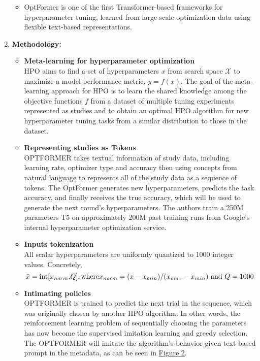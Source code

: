 \documentclass[11pt]{article}
\begin{document}
\begin{enumerate}
\begin{itemize}
            \item OptFormer is one of the first Transformer-based frameworks for hyperparameter tuning, learned from large-scale optimization data using flexible text-based representations.
    \end{itemize}
    \item
    \textbf{Methodology:}
    \begin{itemize}
        \item \textbf{Meta-learning for hyperparameter optimization}\\
        HPO aims to find a set of hyperparameters $x$ from search space $\mathcal{X}$ to maximize a model performance metric, $y = f(x)$. The goal of the meta-learning \cite{https://doi.org/10.48550/arxiv.2004.05439} approach for HPO is to learn the shared knowledge among the objective functions $f$ from a dataset of multiple tuning experiments represented as studies and to obtain an optimal HPO algorithm for new hyperparameter tuning tasks from a similar distribution to those in the dataset.\\
        \item \textbf{Representing studies as Tokens}\\
        OPTFORMER takes textual information of study data, including learning rate, optimizer type and accuracy then using concepts from natural language to represents all of the study data as a sequence of tokens. The OptFormer generates new hyperparameters, predicts the task accuracy, and finally receives the true accuracy, which will be used to generate the next round’s hyperparameters. The authors train a 250M parameters T5 \cite{https://doi.org/10.48550/arxiv.2002.08910} on  approximately 200M past training runs from Google’s internal hyperparameter optimization service.\\
        \item \textbf{Inputs tokenization}\\
        All scalar hyperparameters are uniformly quantized to 1000 integer values. Concretely, 
        $$
        \Bar{x} = \text{int}[x_{norm} . Q], \text{where} x_{norm} = (x-x_{min})/(x_{max}-x_{min}) \text{ and } Q = 1000
        $$
        \item \textbf{Intimating policies}\\
        OPTFORMER is trained to predict the next trial in the sequence, which was originally chosen by another HPO algorithm. In other words, the reinforcement learning problem of sequentially choosing the parameters has now become the supervised imitation learning and greedy selection. The OPTFORMER will imitate the algorithm's behavior given text-based prompt in the metadata, as can be seen in \hyperref[fig:result1]{Figure 2}.\\

\end{itemize}
\end{enumerate}
\end{document}
